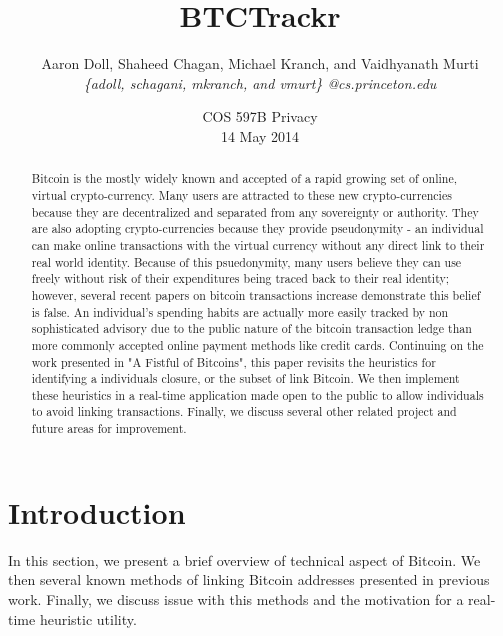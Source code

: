 \documentclass[10pt, letterpaper, twocolumn, twoside]{article}
\title{\bf BTCTrackr}
\author{Aaron Doll, Shaheed Chagan, Michael Kranch, and Vaidhyanath Murti\\
\textit{\{adoll, schagani, mkranch, and vmurt\} @cs.princeton.edu}}
\date{COS 597B Privacy \\ 14 May 2014}
\begin{document}
\maketitle

\thispagestyle{empty}

\begin{abstract}
Bitcoin is the mostly widely known and accepted of a rapid growing set of online, virtual crypto-currency. Many users are attracted to these new crypto-currencies because they are decentralized and separated from any sovereignty or authority. They are also adopting crypto-currencies because they provide pseudonymity - an individual can make online transactions with the virtual currency without any direct link to their real world identity. Because of this psuedonymity, many users believe they can use freely without risk of their expenditures being traced back to their real identity; however, several recent papers on bitcoin transactions increase demonstrate this belief is false. An individual's spending habits are actually more easily tracked by non sophisticated advisory due to the public nature of the bitcoin transaction ledge than more commonly accepted online payment methods like credit cards. Continuing on the work presented in "A Fistful of Bitcoins", this paper revisits the heuristics for identifying a individuals closure, or the subset of link Bitcoin. We then implement these heuristics in a real-time application made open to the public to allow individuals to avoid linking transactions. Finally, we discuss several other related project and future areas for improvement.

\end{abstract}

\section{Introduction}
\label{intro}
In this section, we present a brief overview of technical aspect of Bitcoin. We then several known methods of linking Bitcoin addresses presented in previous work. Finally, we discuss issue with this methods and the motivation for a real-time heuristic utility. 
\end{document}
